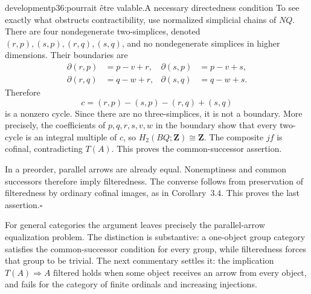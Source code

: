\begin{dcomment}{development}{p36:pourrait être valable.}{A necessary directedness condition}
To see exactly what obstructs contractibility, use normalized simplicial chains of $NQ$. There are four nondegenerate two-simplices, denoted $(r,p),(s,p),(r,q),(s,q)$, and no nondegenerate simplices in higher dimensions. Their boundaries are
\[
\begin{aligned}
 \partial(r,p)&=p-v+r,&\partial(s,p)&=p-v+s,\\
 \partial(r,q)&=q-w+r,&\partial(s,q)&=q-w+s.
\end{aligned}
\]
Therefore
\[
 c=(r,p)-(s,p)-(r,q)+(s,q)
\]
is a nonzero cycle. Since there are no three-simplices, it is not a boundary. More precisely, the coefficients of $p,q,r,s,v,w$ in the boundary show that every two-cycle is an integral multiple of $c$, so $H_2(BQ;\mathbf Z)\cong\mathbf Z$. The composite $jf$ is cofinal, contradicting $T(A)$. This proves the common-successor assertion.

In a preorder, parallel arrows are already equal. Nonemptiness and common successors therefore imply filteredness. The converse follows from preservation of filteredness by ordinary cofinal images, as in Corollary~3.4. This proves the last assertion.\hfill$\square$

For general categories the argument leaves precisely the parallel-arrow equalization problem. The distinction is substantive: a one-object group category satisfies the common-successor condition for every group, while filteredness forces that group to be trivial. The next commentary settles it: the implication $T(A)\Rightarrow A\text{ filtered}$ holds when some object receives an arrow from every object, and fails for the category of finite ordinals and increasing injections.
\end{dcomment}

